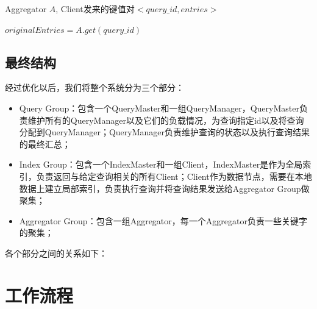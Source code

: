 \documentclass{elegantpaper}
\begin{document}
\begin{algorithm}

    \begin{algorithmic}[1]

        \Require Aggregator $A$, Client发来的键值对$<query\_id, entries>$

                \State $originalEntries = A.get(query\_id)$
                    \Else
                    \EndIf
                \EndFor
            \Else
            \EndIf
        \EndFunction
        
    \end{algorithmic}
    
\end{algorithm}

\subsection{最终结构}

经过优化以后，我们将整个系统分为三个部分：

\begin{itemize}

    \item Query Group：包含一个QueryMaster和一组QueryManager，QueryMaster负责维护所有的QueryManager以及它们的负载情况，为查询指定id以及将查询分配到QueryManager；QueryManager负责维护查询的状态以及执行查询结果的最终汇总；

    \item Index Group：包含一个IndexMaster和一组Client，IndexMaster是作为全局索引，负责返回与给定查询相关的所有Client；Client作为数据节点，需要在本地数据上建立局部索引，负责执行查询并将查询结果发送给Aggregator Group做聚集；
    
    \item Aggregator Group：包含一组Aggregator，每一个Aggregator负责一些关键字的聚集；
    
\end{itemize}

\noindent 各个部分之间的关系如下：

\section{工作流程}
\end{document}
